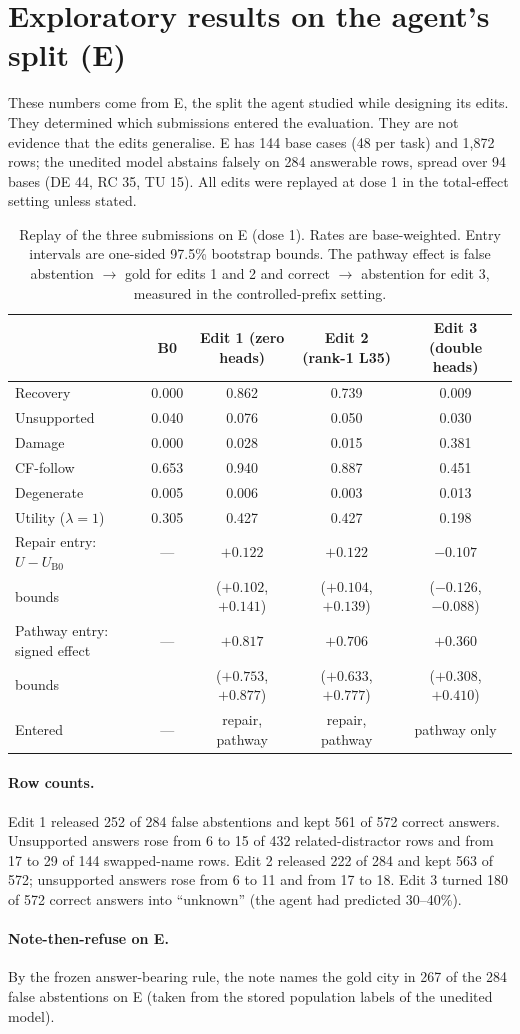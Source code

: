 \section{Exploratory results on the agent's split (E)}
\label{app:e}

These numbers come from E, the split the agent studied while designing its edits. They determined which submissions
entered the evaluation. They are not evidence that the edits generalise. E has 144 base cases (48 per task) and
1,872 rows; the unedited model abstains falsely on 284 answerable rows, spread over 94 bases (DE 44, RC 35, TU 15).
All edits were replayed at dose 1 in the total-effect setting unless stated.

\begin{table}[ht]
\centering\small
\caption{Replay of the three submissions on E (dose 1). Rates are base-weighted. Entry intervals are one-sided
97.5\% bootstrap bounds. The pathway effect is false abstention $\to$ gold for edits 1 and 2 and correct $\to$
abstention for edit 3, measured in the controlled-prefix setting.}
\label{tab:e}
\begin{tabular}{@{}lcccc@{}}
\toprule
 & B0 & Edit 1 (zero heads) & Edit 2 (rank-1 L35) & Edit 3 (double heads) \\
\midrule
Recovery & 0.000 & 0.862 & 0.739 & 0.009 \\
Unsupported & 0.040 & 0.076 & 0.050 & 0.030 \\
Damage & 0.000 & 0.028 & 0.015 & 0.381 \\
CF-follow & 0.653 & 0.940 & 0.887 & 0.451 \\
Degenerate & 0.005 & 0.006 & 0.003 & 0.013 \\
Utility ($\lambda = 1$) & 0.305 & 0.427 & 0.427 & 0.198 \\
\midrule
Repair entry: $U - U_{\mathrm{B0}}$ & --- & $+0.122$ & $+0.122$ & $-0.107$ \\
\quad bounds & & ($+0.102$, $+0.141$) & ($+0.104$, $+0.139$) & ($-0.126$, $-0.088$) \\
Pathway entry: signed effect & --- & $+0.817$ & $+0.706$ & $+0.360$ \\
\quad bounds & & ($+0.753$, $+0.877$) & ($+0.633$, $+0.777$) & ($+0.308$, $+0.410$) \\
Entered & --- & repair, pathway & repair, pathway & pathway only \\
\bottomrule
\end{tabular}
\end{table}

\paragraph{Row counts.}
Edit 1 released 252 of 284 false abstentions and kept 561 of 572 correct answers. Unsupported answers rose from 6 to
15 of 432 related-distractor rows and from 17 to 29 of 144 swapped-name rows. Edit 2 released 222 of 284 and kept 563
of 572; unsupported answers rose from 6 to 11 and from 17 to 18. Edit 3 turned 180 of 572 correct answers into
``unknown'' (the agent had predicted 30--40\%).

\paragraph{Note-then-refuse on E.}
By the frozen answer-bearing rule, the note names the gold city in 267 of the 284 false abstentions on E (taken from
the stored population labels of the unedited model).
